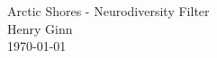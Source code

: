 \documentclass[hidelinks, 11 pt]{article}
\begin{document}
\begin{center}
	\huge Arctic Shores - Neurodiversity Filter  \\
	\vspace{5mm}
	\large Henry Ginn  \\
	\vspace{3 mm}
	\large \today
\end{center}







\end{document}
